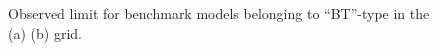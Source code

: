 \clearpage
\begin{figure}[h]
  \centering
    \caption{
    Observed limit for benchmark models belonging to ``BT''-type in the (a) \xhalf (b) \varx grid.
      \label{fig::Result::combLimit::BT1} }
\end{figure}


